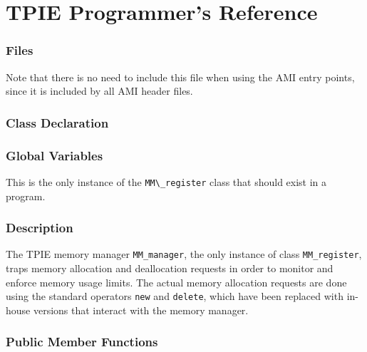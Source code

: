 
\chapter{TPIE Programmer's Reference}





\subsection{Files}
  \btabb
     {Note that there is no need to
include this file when using the AMI entry points, since it is included by
all AMI header files.}
  \etabb

\subsection{Class Declaration}
  \btabb
     {}
  \etabb

\subsection{Global Variables}
  \btabb
     {This is the only instance of
the \lstinline|MM\_register| class that should exist in a program.}
  \etabb

\subsection{Description}
The TPIE memory manager \lstinline|MM_manager|, the only instance of class
\lstinline|MM_register|, traps memory allocation and deallocation requests in
order to monitor and enforce memory usage limits. The actual memory
allocation requests are done using the standard \CPP{} operators \lstinline|new|
and \lstinline|delete|, which have been replaced with in-house versions that
interact with the memory manager.

\subsection{Public Member Functions}
  \btabb

